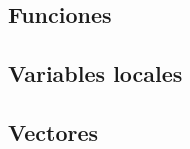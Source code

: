\documentclass[12pt,a4paper]{article}
\begin{document}
\subsection{Funciones}

\subsection{Variables locales}

\subsection{Vectores}
\end{document}
